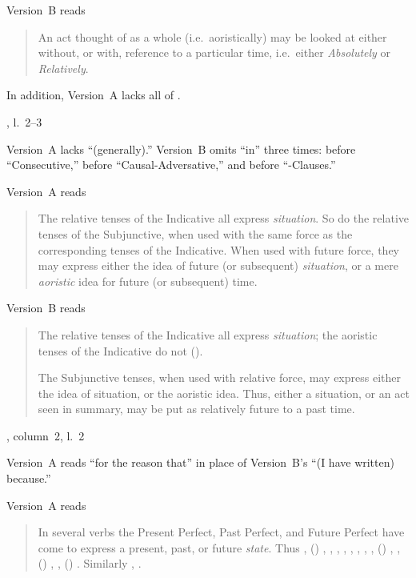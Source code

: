 \begin{variations}
Version~B reads
\begin{quote}
An act thought of as a whole (i.e.\ aoristically) may be looked at
either without, or with, reference to a particular time, i.e.\ either
\emph{Absolutely} or \emph{Relatively}.
\end{quote}

In addition, Version~A lacks all of .

\item[{\xref[4, \emph{a}]{470}, l.~2–3}]

Version~A lacks “(generally).”  Version~B omits “in” three times:
before “Consecutive,” before “Causal-Adversative,” and before
“-Clauses.”

\item[{\xref[\emph{b}]{477}}]

Version~A reads
\begin{quote}
The relative tenses of the Indicative all express \emph{situation}.
So do the relative tenses of the Subjunctive, when used with the same
force as the corresponding tenses of the Indicative.  When used with
future force, they may express either the idea of future (or
subsequent) \emph{situation}, or a mere \emph{aoristic} idea for
future (or subsequent) time.
\end{quote}

Version~B reads
\begin{quote}
The relative tenses of the Indicative all express \emph{situation};
the aoristic tenses of the Indicative do not ().

The Subjunctive tenses, when used with relative force, may express
either the idea of situation, or the aoristic idea.  Thus, either a
situation, or an act seen in summary, may be put as relatively future
to a past time.
\end{quote}

\item[{\xref{481}, column~2, l.~2}]

Version~A reads “for the reason that” in place of Version~B's “(I have
written) because.”

\item[{\xref{487}}]

Version~A reads
\begin{quote}
In several verbs the Present Perfect, Past Perfect, and Future Perfect
have come to express a present, past, or future \emph{state}.  Thus
, () ,
, , , ,
, , , () , ,
() , ,
() . Similarly
  , .
\end{quote}


\end{variations}
